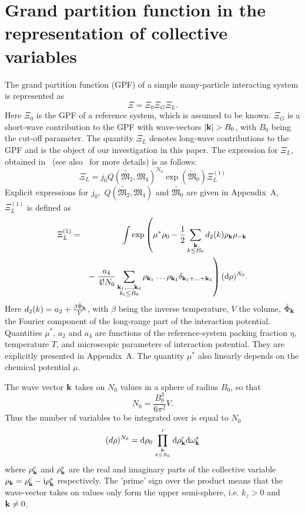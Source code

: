 \section{\label{sec:init-gpf} Grand partition function in the representation of collective variables}
The grand partition function (GPF) of a simple many-particle interacting system is represented as
\begin{equation}
	\label{Xi_as_prod}
	\Xi = \Xi_0\Xi_G\Xi_L.
\end{equation}
Here $\Xi_0$ is the GPF of a reference system, which is assumed to be known. $\Xi_G$ is a short-wave contribution to the GPF with wave-vectors $\abs{\vb{k}}>B_0$, with $B_0$ being the cut-off parameter.
The quantity $\Xi_L$ denotes long-wave contributions to the GPF and is the object of our investigation in this paper. The expression for $\Xi_L$, obtained in~\cite{RomaJPS2024} (see also~\cite{Roma2023Preprint} for more details) is as follows:
\begin{equation}
	\label{Xi_L}
	\Xi_L = j_0Q(\tilde{\mathfrak{M}_2}, \mathfrak{M}_4)^{N_0} \exp(\tilde{\mathfrak{M}}_0) \Xi_L^{(1)}
\end{equation} 
Explicit expressions for $j_0,$ $Q(\tilde{\mathfrak{M}_2}, \mathfrak{M}_4)$ and $\tilde{\mathfrak{M}_0}$ are given in Appendix~A, $\Xi_L^{(1)}$ is defined as
\begin{eqnarray}
	\label{Xi_L_1}
	\Xi_L^{(1)} &=& 
	\int \exp\left(
	\mu^* \rho_0 - \frac{1}{2} \sum_{\substack{\vb k \\ k \leq B_0}} d_2(k) \rho_{\vb k} \rho_{-\vb k} 
	\right.\\
	&& -\left. \frac{a_4}{4! N_0} \sum_{\substack{\vb k_1, \dotsc, \vb k_4 \\ k_i \leq B_0}} \rho_{\vb k_1} \dotsc \rho_{\vb k_4} \delta_{\vb{k}_1 + \dotsc + \vb{k}_4} \right) ({\rm d} \rho)^{N_0}
	\nonumber.
\end{eqnarray}
Here $d_2(k) = a_2 + \frac{\beta\hat{\Phi}_{\vb k}}{V}$, with $\beta$ being the inverse temperature, $V$ the volume, $\hat{\Phi}_{\vb k}$ the Fourier component of the long-range part of the interaction potential.
Quantities $\mu^*$, $a_2$ and $a_4$ are functions of the reference-system packing fraction $\eta$, temperature $T$, and microscopic parameters of interaction potential. They are explicitly presented in Appendix~A. The quantity $\mu^*$ also linearly depends on the chemical potential $\mu$.

The wave vector $\vb k$ takes on $N_0$ values in a sphere of radius $B_0$, so that
\begin{equation}
	\label{NB}
	N_0 = \frac{B_0^3}{6\pi^2}V.
\end{equation}
Thus the number of variables to be integrated over is equal to $N_0$
\begin{equation*}
	(d\rho)^{N_0} = {\rm d}\rho_0 \prod_{\vb k\atop k\le B_0}' {\rm d}\rho_{\vb k}^c {\rm d}\omega_{\vb k}^s
\end{equation*}
where $\rho_{\vb k}^c$ and $\rho_{\vb k}^s$ are the real and imaginary parts of the collective variable $\rho_{\vb k} = \rho_{\vb k}^c - {\rm i} \rho_{\vb k}^s$ respectively. The 'prime' sign over the product means that the wave-vector takes on values only form the upper semi-sphere, i.e. $k_z > 0$ and $\vb k \neq 0$.

